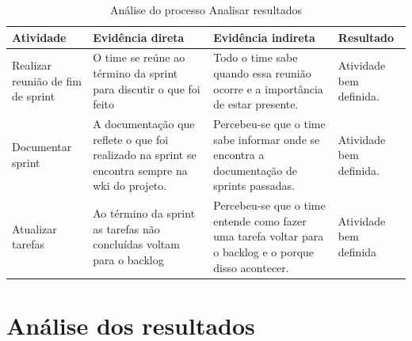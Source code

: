 \documentclass[a4paper, 11pt]{article}
\begin{document}
\begin{table}[]
\centering
\caption{Análise do processo Analisar resultados}
\label{tab:analisar}
\begin{tabularx}{\textwidth}{|X|X|X|X|}
\hline
Atividade & Evidência direta & Evidência indireta & Resultado \\ \hline
Realizar reunião de fim de sprint & O time se reúne ao término da sprint para discutir o que foi feito & Todo o time sabe quando essa reunião ocorre e a importância de estar presente. & Atividade bem definida. \\ \hline
Documentar sprint & A documentação que reflete o que foi realizado na sprint se encontra sempre na wki do projeto. & Percebeu-se que o time sabe informar onde se encontra a documentação de sprints passadas. & Atividade bem definida. \\ \hline
Atualizar tarefas & Ao término da sprint as tarefas não concluídas voltam para o backlog & Percebeu-se que o time entende como fazer uma tarefa voltar para o backlog e o porque disso acontecer. & Atividade bem definida \\ \hline
\end{tabularx}
\end{table}

\section*{Análise dos resultados}

\begin{table}[h]
\centering
{}
\caption{Relatório de Avaliação}
\label{tab:relatorio_de_avaliacao}
\end{table}
\end{document}
